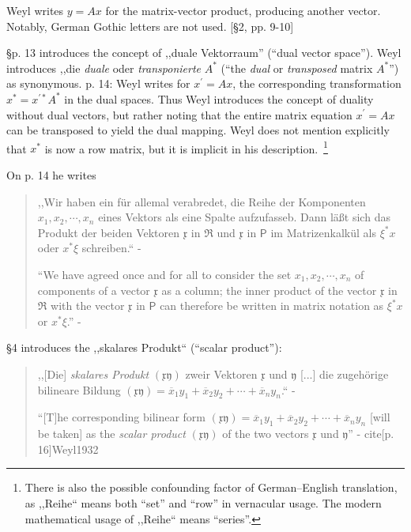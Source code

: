 Weyl writes $y = A x$ for the matrix-vector product, producing another vector.
Notably, German Gothic letters are not used. [\S 2, pp. 9-10]

\S p. 13 introduces the concept of ,,duale Vektorraum'' (``dual vector space'').
Weyl introduces ,,die \textit{duale} oder \textit{transponierte} $A^*$
(``the \textit{dual} or \textit{transposed} matrix $A^*$'')
as synonymous.
p. 14: Weyl writes for $x^\prime = A x$, the corresponding transformation $x^* = x^{\prime *} A^*$
in the dual spaces.
Thus Weyl introduces the concept of duality without dual vectors, but rather noting
that the entire matrix equation $x^\prime = A x$ can be transposed to yield the
dual mapping. Weyl does not mention explicitly that $x^*$ is now a row matrix, but it is
implicit in his description.~\footnote{There is also the possible confounding
factor of German--English translation, as ,,Reihe`` means both ``set'' and ``row''
in vernacular usage. The modern mathematical usage of ,,Reihe`` means ``series''.}

On p. 14 he writes
\begin{quote}
,,Wir haben ein für allemal verabredet, die Reihe der Komponenten $x_1, x_2, \cdots, x_n$
eines Vektors als eine Spalte aufzufasseb. Dann läßt sich das Produkt der beiden
Vektoren $\mathfrak x$ in $\mathfrak R$ und $\mathfrak x$ in $\mathsf P$
im Matrizenkalkül als $\xi^* x$ oder $x^* \xi$ schreiben.`` - \cite[p. 14]{Weyl1928}

``We have agreed once and for all to consider the set
$x_1, x_2, \cdots, x_n$ of components of a vector $\mathfrak x$ as a column; the
inner product of the vector $\mathfrak x$ in $\mathfrak R$ with the vector $\mathfrak x$
in $\mathsf P$ can therefore be written in matrix notation as $\xi^* x$ or $x^* \xi$.''
- \cite[p. 14]{Weyl1931}
\end{quote}

\S 4 introduces the ,,skalares Produkt`` (``scalar product''):
\begin{quote}
,,[Die] \textit{skalares Produkt} $(\mathfrak x \mathfrak y)$ zweir Vektoren
$\mathfrak x$ und $\mathfrak y$ [...] die zugehörige bilineare Bildung
$(\mathfrak x \mathfrak y) = \overline x_1 y_1 + \overline x_2 y_2 + \cdots + \overline x_n y_n $.``
- \cite[p. 15]{Weyl1928}

``[T]he corresponding bilinear form
$(\mathfrak x \mathfrak y) = \overline x_1 y_1 + \overline x_2 y_2 + \cdots + \overline x_n y_n $
[will be taken] as the \textit{scalar product} $(\mathfrak x \mathfrak y)$ of the two vectors
$\mathfrak x$ und $\mathfrak y$'' - cite[p. 16]{Weyl1932}
\end{quote}


